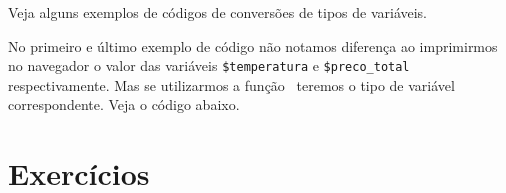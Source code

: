 

Veja alguns exemplos de códigos de conversões de tipos de variáveis.



No primeiro e último exemplo de código não notamos diferença ao imprimirmos no navegador 
o valor das variáveis \texttt{\$temperatura} e \texttt{\$preco\_total} respectivamente. 
Mas se utilizarmos a função \funcaogettype~teremos o tipo de variável correspondente. Veja
o código abaixo.



\section{Exercícios}
\label{cap3-exercicios}


